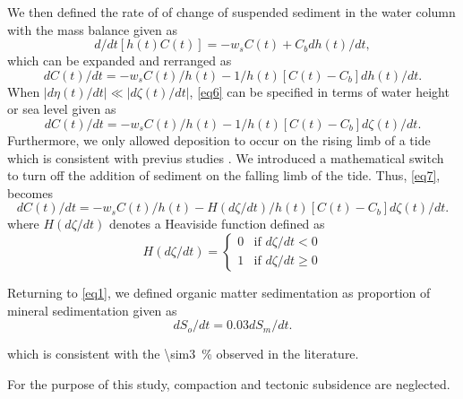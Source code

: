 We then defined the rate of of change of suspended sediment in the water column with the mass balance given as
\begin{equation}\label{eq5}
	d/dt[h(t)C(t)] = -w_s C(t) + C_b dh(t)/dt,
\end{equation}
which can be expanded and rerranged as
\begin{equation}\label{eq6}
	dC(t)/dt = - w_s C(t)/h(t) - 1/h(t)[C(t) - C_b] dh(t)/dt.
\end{equation}
When $\displaystyle\left\lvert d\eta(t)/dt \right\rvert \ll \displaystyle\left\lvert d\zeta(t)/dt \right\rvert$, \autoref{eq6} can be specified in terms of water height or sea level given as
\begin{equation}\label{eq7}
	dC(t)/dt = - w_s C(t)/h(t) - 1/h(t) [C(t) - C_b] d\zeta(t)/dt.
\end{equation}
Furthermore, we only allowed deposition to occur on the rising limb of a tide which is consistent with previus studies \citep{kroneMethodSimulatingMarsh1987, allenSaltmarshGrowthStratification1990, frenchNumericalSimulationVertical1993, temmermanModellingLongtermTidal2003, temmermanModellingEstuarineVariations2004}. We introduced a mathematical switch to turn off the addition of sediment on the falling limb of the tide. Thus, \autoref{eq7}, becomes
\begin{equation}\label{eq8}
	dC(t)/dt = - w_s C(t)/h(t) - H(d\zeta/dt)/h(t) [C(t) - C_b] d\zeta(t)/dt.
\end{equation}
where $H(d\zeta/dt)$ denotes a Heaviside function defined as
\begin{equation}\label{eq9}
	H(d\zeta/dt) = 
  \begin{cases}
    0 & \text{if $d\zeta/dt < 0$}\\
    1 & \text{if $d\zeta/dt \geq 0$}
  \end{cases}
\end{equation}

Returning to \autoref{eq1}, we defined organic matter sedimentation as proportion of mineral sedimentation given as
\begin{equation}\label{eq10}
	dS_o/dt = 0.03dS_m/dt.
\end{equation}

which is consistent with the \SI{\sim3}{\percent} observed in the literature.

For the purpose of this study, compaction and tectonic subsidence are neglected.

